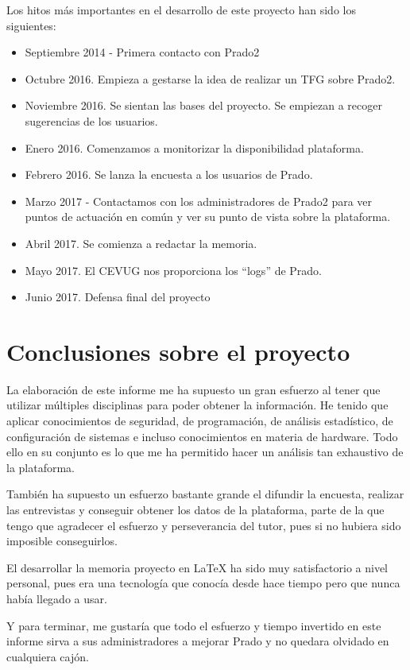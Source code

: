 Los hitos más importantes en el desarrollo de este proyecto han sido los siguientes:

\begin{itemize}
	\item Septiembre 2014 - Primera contacto con Prado2

    \item Octubre 2016. Empieza a gestarse la idea de realizar un TFG sobre Prado2.
    
    \item Noviembre 2016. Se sientan las bases del proyecto. Se empiezan a recoger sugerencias de los usuarios.
    
    \item Enero 2016. Comenzamos a monitorizar la disponibilidad plataforma.
    
    \item Febrero 2016. Se lanza la encuesta a los usuarios de Prado.
    
    \item Marzo 2017 - Contactamos con los administradores de Prado2 para ver puntos de actuación en común y ver su punto de vista sobre la plataforma.
    
    \item Abril 2017. Se comienza a redactar la memoria.

    \item Mayo 2017. El CEVUG nos proporciona los ``logs'' de Prado.
    
    \item Junio 2017. Defensa final del proyecto

\end{itemize}

\section{Conclusiones sobre el proyecto}

La elaboración de este informe me ha supuesto un gran esfuerzo al tener que utilizar múltiples disciplinas para poder obtener la información. He tenido que aplicar conocimientos de seguridad, de programación, de análisis estadístico, de configuración de sistemas e incluso conocimientos en materia de hardware. Todo ello en su conjunto es lo que me ha permitido hacer un análisis tan exhaustivo de la plataforma.

\bigskip
También ha supuesto un esfuerzo bastante grande el difundir la encuesta, realizar las entrevistas y conseguir obtener los datos de la plataforma, parte de la que tengo que agradecer el esfuerzo y perseverancia del tutor, pues si no hubiera sido imposible conseguirlos.

\bigskip
El desarrollar la memoria proyecto en LaTeX ha sido muy satisfactorio a nivel personal, pues era una tecnología que conocía desde hace tiempo pero que nunca había llegado a usar.

\bigskip
Y para terminar, me gustaría que todo el esfuerzo y tiempo invertido en este informe sirva a sus administradores a mejorar Prado y no quedara olvidado en cualquiera cajón.


